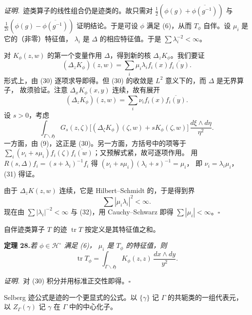\smallskip
\noindent\emph{证明.}\ 迹类算子的线性组合仍是迹类的。故只需对
$\tfrac12(\phi(g)+\overline{\phi(g^{-1})})$ 与 $\tfrac1{2i}(\phi(g)-\overline{\phi(g^{-1})})$
证明结论。于是可设 $\phi$ 满足 (6)，从而 $T_{\phi}$ 自伴。设 $\mu_{i}$ 是它的（非零）特征值，
$\lambda_{i}$ 是 $\Delta$ 的相应特征值。于是 $\sum\lambda_{i}^{-2}<\infty$。

对 $K_{\phi}(z,w)$ 的第一个变量作用 $\Delta$，得到新的核 $\Delta_{z}K_{\phi}$。我们要证
\begin{equation}\tag{31}
(\Delta_{z}K_{\phi})(z,w)=\sum_{i}\mu_{i}\lambda_{i}f_{i}(x)\overline{f_{i}(y)} .
\end{equation}
形式上，由 (30) 逐项求导即得。但 (30) 的收敛是 $L^{2}$ 意义下的，而 $\Delta$ 是无界算子，
故须验证。注意 $\Delta_{x}K_{\phi}(x,y)$ 连续，故有展开
\[
(\Delta_{z}K_{\phi})(z,w)=\sum_{i}\nu_{i}f_{i}(x)\overline{f_{i}(y)} .
\]
设 $s>0$，考虑
\[
\int_{\Gamma\backslash\mathfrak{H}}G_{s}(z,\zeta)
\bigl[(\Delta_{\zeta}K_{\phi})(\zeta,w)+sK_{\phi}(\zeta,w)\bigr]\,
\frac{d\xi\wedge d\eta}{\eta^{2}} .
\]
一方面，由 (9)，这正是 (30)。另一方面，方括号中的项等于
$\sum_{i}(\nu_{i}+s\mu_{i})f_{i}(\zeta)\overline{f_{i}(w)}$；又预解式紧，故可逐项作用。
用 $R(s,\Delta)f_{i}=(s+\lambda_{i})^{-1}f_{i}$ 得 $(\nu_{i}+s\mu_{i})(\lambda_{i}+s)^{-1}=\mu_{i}$，
即 $\nu_{i}=\lambda_{i}\mu_{i}$，(31) 得证。

由于 $\Delta_{z}K(z,w)$ 连续，它是 Hilbert--Schmidt 的，于是得到界
\begin{equation}\tag{32}
\sum|\mu_{i}\lambda_{i}|^{2}<\infty .
\end{equation}
现在由 $\sum|\lambda_{i}|^{-2}<\infty$ 与 (32)，用 Cauchy--Schwarz 即得
$\sum|\mu_{i}|<\infty$。\hfill$\square$

自伴迹类算子 $T$ 的迹 $\operatorname{tr}T$ 按定义是其特征值之和。

\par\medskip\noindent\textbf{定理 28.}\quad\emph{若 $\phi\in\mathcal{H}^{\circ}$ 满足 (6)，
$\mu_{i}$ 是 $T_{\phi}$ 的特征值，则}
\begin{equation}\tag{33}
\operatorname{tr}T_{\phi}=\int_{\Gamma\backslash\mathfrak{H}}K_{\phi}(z,z)\,
\frac{dx\wedge dy}{y^{2}} .
\end{equation}

\smallskip
\noindent\emph{证明.}\ 对 (30) 积分并用标准正交性即得。\hfill$\square$

Selberg 迹公式是迹的一个更显式的公式。以 $\{\gamma\}$ 记 $\Gamma$ 的共轭类的一组代表元，
以 $Z_{\Gamma}(\gamma)$ 记 $\gamma$ 在 $\Gamma$ 中的中心化子。

